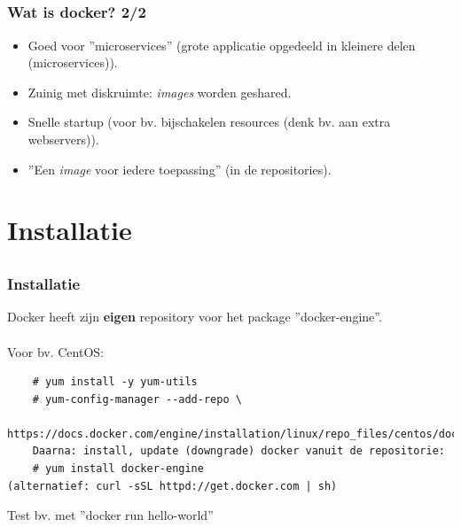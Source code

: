 \subsection{}
\begin{styleframe}
	\frametitle{Wat is docker? 2/2}
\begin{itemize}
	\item Goed voor ''microservices'' (grote applicatie opgedeeld in kleinere delen (microservices)).
	\pause
	\item Zuinig met diskruimte: {\it images} worden geshared.
	\pause
	\item Snelle startup (voor bv. bijschakelen resources (denk bv. aan extra webservers)).
	\pause
	\item ''Een {\it image} voor iedere toepassing'' (in de repositories).
\end{itemize}
\end{styleframe}

\section{Installatie}
\subsection{}
\begin{styleframefrag}
	\frametitle{Installatie}
Docker heeft zijn {\bf eigen} repository voor het package ''docker-engine''.\\
\pause
~\\
Voor bv. CentOS:
{\tiny
\begin{verbatim}
    # yum install -y yum-utils
    # yum-config-manager --add-repo \
        https://docs.docker.com/engine/installation/linux/repo_files/centos/docker.repo
    Daarna: install, update (downgrade) docker vanuit de repositorie:
    # yum install docker-engine
(alternatief: curl -sSL httpd://get.docker.com | sh)
\end{verbatim}
}
\pause
Test bv. met ''docker run hello-world''
\end{styleframefrag}

